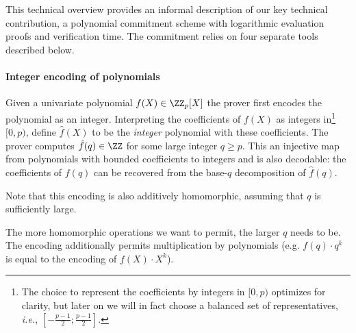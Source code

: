 This technical overview provides an informal description of our key technical contribution, a polynomial commitment scheme with logarithmic evaluation proofs and verification time.
The commitment relies on four separate tools described below.
\paragraph{Integer encoding of polynomials}
Given a univariate polynomial $f(X)\in \ZZ_p[X]$ the prover first encodes the polynomial as an integer. Interpreting the coefficients of $f(X)$ as integers in\footnote{The choice to represent the coefficients by integers in $[0,p)$ optimizes for clarity, but later on we will in fact choose a balanced set of representatives, \emph{i.e.}, $[-\frac{p-1}{2}; \frac{p-1}{2}]$.} $[0, p)$, define $\hat{f}(X)$ to be the \emph{integer} polynomial with these coefficients. The prover computes $\hat{f}(q)\in \ZZ$ for some large integer $q\geq p$. This an injective map from polynomials with bounded coefficients to integers and is also decodable: the coefficients of $f(q)$ can be recovered from the base-$q$ decomposition of $\hat{f}(q)$.
\begin{comment}
For example assume that $f(X)=2X^3+3X^2+4X+1 \in \ZZ_5[X]$ and $q=10$. Then the integer $f(q)=2341$ encodes the polynomial $f(X)$ because its coefficients appear in the $q$-ary expansion of $f(q)$.
\end{comment}
Note that this encoding is also additively homomorphic, assuming that $q$ is sufficiently large. 
\begin{comment}
For example, let $g(X)=4X^3+1X^2+3$ such that $g(10)=4103$. Then $f(10)+g(10)=6444=(g+f)(10)$. 
\end{comment}
The more homomorphic operations we want to permit, the larger $q$ needs to be.
The encoding additionally permits multiplication by polynomials (e.g. $f(q)\cdot q^k$ is equal to the encoding of $f(X)\cdot X^k$). 
\begin{comment}
Or in our example $100 \cdot f(10)=234100$ which is the encoding of $2\cdot X^5+3\cdot X^4+4\cdot X^3+X^2$.
\end{comment}

